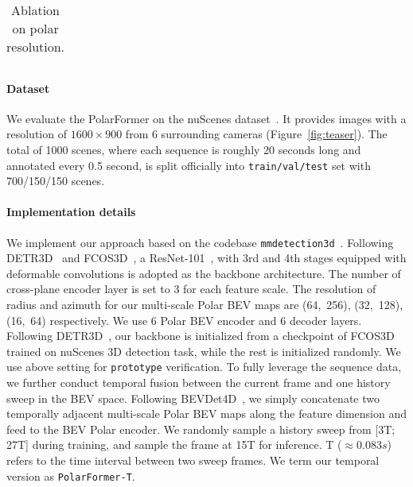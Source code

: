 \documentclass[letterpaper]{article} \usepackage{aaai23}  \usepackage{times}  \usepackage{helvet}  \usepackage{courier}  \usepackage[hyphens]{url}  \usepackage{graphicx} \urlstyle{rm} \def\UrlFont{\rm}  \usepackage{natbib}  \usepackage{caption} \frenchspacing  \setlength{\pdfpagewidth}{8.5in} \setlength{\pdfpageheight}{11in} \usepackage{algorithm}
\begin{document}
\begin{table*}[t]
\begin{subtable}[h]{0.3\textwidth}
{\begin{tabular}{lll||ll}
        \hline
        \end{tabular}
        }
        \caption{Ablation on polar resolution.}
        \label{table:resolution}
    \end{subtable}
\vspace{-10pt}
\end{table*}
 
\paragraph{Dataset}
We evaluate the PolarFormer on the nuScenes dataset~\cite{nuscenes2019}.
It provides images with a resolution of $1600 \times 900$ from 6 surrounding cameras (Figure~\ref{fig:teaser}). 
The total of 1000 scenes, where each sequence is roughly 20 seconds long and annotated every 0.5 second, is split officially into \texttt{train/val/test} set with 700/150/150 scenes. 
\paragraph{Implementation details}
We implement our approach based on the codebase \texttt{mmdetection3d}~\cite{mmdet3d2020}.
Following DETR3D~\cite{wang2022detr3d} and FCOS3D~\cite{wang2021fcos3d}, a ResNet-101~\cite{he2016deep}, with 3rd and 4th stages equipped with deformable convolutions is adopted as the backbone architecture. 
The number of cross-plane encoder layer is set to 3 for each feature scale.
The resolution of radius and azimuth for our multi-scale Polar BEV maps are (64,~256), (32,~128), (16,~64) respectively.
We use 6 Polar BEV encoder and 6 decoder layers.
Following DETR3D~\cite{wang2022detr3d}, our backbone is initialized from a checkpoint of FCOS3D~\cite{wang2021fcos3d} trained on nuScenes 3D detection task, while the rest is initialized randomly. 
We use above setting for \texttt{prototype} verification.
To fully leverage the sequence data, we further conduct temporal fusion between the current frame and one history sweep in the BEV space. 
Following BEVDet4D~\cite{huang2022bevdet4d}, we simply concatenate two temporally adjacent multi-scale Polar BEV maps along the feature dimension and feed to the BEV Polar encoder.
We randomly sample a history sweep from [3T; 27T] during training,
and sample the frame at 15T for inference. 
T ($ \approx 0.083s$) refers to the time interval between two sweep frames.
We term our temporal version as \texttt{PolarFormer-T}.
\end{document}
